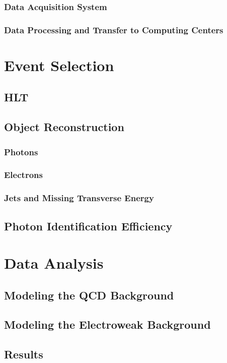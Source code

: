 \documentclass[12pt, letterpaper]{report}
\begin{document}
\subsection{Data Acquisition System}
\subsection{Data Processing and Transfer to Computing Centers}

\chapter{Event Selection}
\section{HLT}
\section{Object Reconstruction}
\subsection{Photons}
\subsection{Electrons}
\subsection{Jets and Missing Transverse Energy}
\section{Photon Identification Efficiency}

\chapter{Data Analysis}
\section{Modeling the QCD Background}
\section{Modeling the Electroweak Background}
\section{Results}
\end{document}

